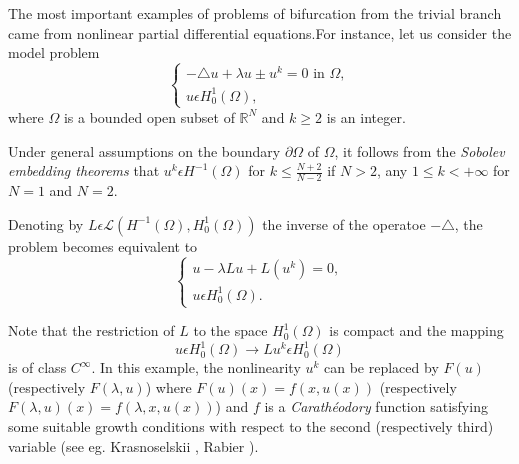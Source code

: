 \begin{examples*}
The most important examples of problems of bifurcation from the trivial branch came from nonlinear partial differential equations.\pageoriginale For instance, let us consider the model problem
\begin{equation*}
\begin{cases}
- \triangle u + \lambda u \pm u^{k} = 0 \text{ in } \Omega,\\
u \epsilon H_{0}^{1} (\Omega),
\end{cases}
\end{equation*}
where $\Omega$ is a bounded open subset of $\mathbb{R}^{N}$ and $k \geq 2$ is an integer.
\end{examples*}

Under general assumptions on the boundary $\partial \Omega$ of $\Omega$, it follows from the {\em Sobolev embedding theorems} that $u^{k} \epsilon H^{-1} (\Omega)$ for $k \leq \frac{N+2}{N-2}$ if $N > 2$, any $1 \leq k < + \infty$ for $N = 1$ and $N = 2$.

Denoting by $L \epsilon \mathscr{L} (H^{-1} (\Omega), H_{0}^{1} (\Omega))$ the inverse of the operatoe $-\triangle$, the problem becomes equivalent to
\begin{equation*}
\begin{cases}
u - \lambda L u + L(u^{k}) = 0,\\
u \epsilon H_{0}^{1} (\Omega).
\end{cases}
\end{equation*}

Note that the restriction of $L$ to the space $H_{0}^{1} (\Omega)$ is compact and the mapping
$$
u \epsilon H_{0}^{1} (\Omega) \to Lu^{k} \epsilon H_{0}^{1} (\Omega)
$$
is of class $C^{\infty}$. In this example, the nonlinearity $u^{k}$ can be replaced by $F(u)$ (respectively $F(\lambda, u)$) where $F(u)(x) = f(x, u(x))$ (respectively $F(\lambda, u)(x) = f(\lambda, x, u(x))$) and $f$ is a {\em Carath\'{e}odory} function satisfying some suitable growth conditions with respect to the second (respectively third) variable (see eg. Krasnoselskii \cite{19}, Rabier \cite{30}).


